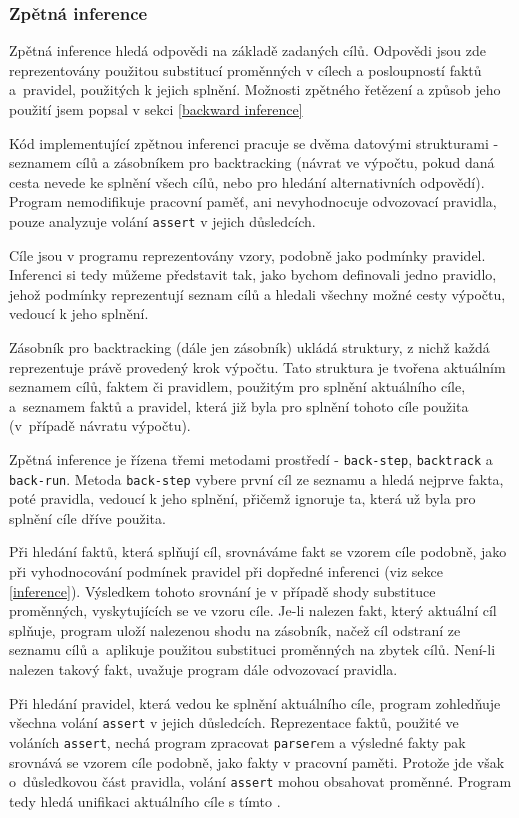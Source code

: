 \subsubsection{Zpětná inference}

Zpětná inference hledá odpovědi na základě zadaných cílů. Odpovědi jsou zde
reprezentovány použitou substitucí proměnných v cílech a posloupností faktů
a~pravidel, použitých k jejich splnění. Možnosti zpětného řetězení a způsob jeho
použití jsem popsal v sekci \ref{backward inference}

Kód implementující zpětnou inferenci pracuje se dvěma datovými strukturami -
seznamem cílů a zásobníkem pro backtracking (návrat ve výpočtu, pokud daná cesta
nevede ke splnění všech cílů, nebo pro hledání alternativních odpovědí). Program
nemodifikuje pracovní paměť, ani nevyhodnocuje odvozovací pravidla, pouze
analyzuje volání \verb|assert| v jejich důsledcích.

Cíle jsou v programu reprezentovány vzory, podobně jako podmínky pravidel.
Inferenci si tedy můžeme představit tak, jako bychom definovali jedno pravidlo,
jehož podmínky reprezentují seznam cílů a hledali všechny možné cesty výpočtu,
vedoucí k jeho splnění.

Zásobník pro backtracking (dále jen zásobník) ukládá struktury, z nichž každá
reprezentuje právě provedený krok výpočtu. Tato struktura je tvořena aktuálním
seznamem cílů, faktem či pravidlem, použitým pro splnění aktuálního cíle,
a~seznamem faktů a pravidel, která již byla pro splnění tohoto cíle použita
(v~případě návratu výpočtu).

Zpětná inference je řízena třemi metodami prostředí - \verb|back-step|,
\verb|backtrack| a \verb|back-run|. Metoda \verb|back-step| vybere první cíl ze
seznamu a hledá nejprve fakta, poté pravidla, vedoucí k jeho splnění, přičemž
ignoruje ta, která už byla pro splnění cíle dříve použita.

Při hledání faktů, která splňují cíl, srovnáváme fakt se vzorem cíle podobně,
jako při vyhodnocování podmínek pravidel při dopředné inferenci (viz sekce
\ref{inference}). Výsledkem tohoto srovnání je v případě shody substituce
proměnných, vyskytujících se ve vzoru cíle. Je-li nalezen fakt, který aktuální
cíl splňuje, program uloží nalezenou shodu na zásobník, načež cíl odstraní ze
seznamu cílů a~aplikuje použitou substituci proměnných na zbytek cílů. Není-li
nalezen takový fakt, uvažuje program dále odvozovací pravidla.

Při hledání pravidel, která vedou ke splnění aktuálního cíle, program zohledňuje
všechna volání \verb|assert| v jejich důsledcích. Reprezentace faktů, použité ve
voláních \verb|assert|, nechá program zpracovat \verb|parser|em a výsledné fakty
pak srovnává se vzorem cíle podobně, jako fakty v pracovní paměti. Protože jde
však o~důsledkovou část pravidla, volání \verb|assert| mohou obsahovat proměnné.
Program tedy hledá unifikaci aktuálního cíle s tímto .

